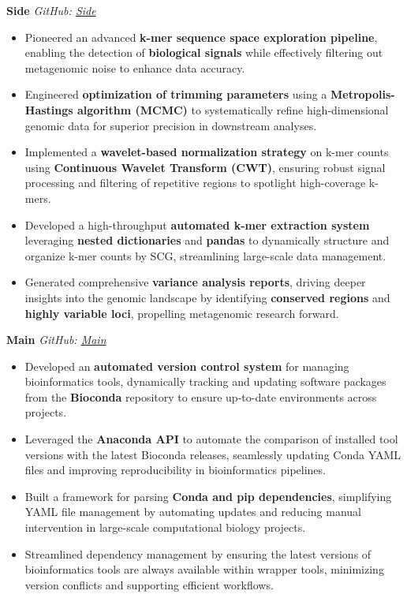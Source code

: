 \documentclass[a4paper,10pt]{article}
\begin{document}
	\textbf{Side} \hfill \textit{GitHub: \href{https://github.com/GABallena/Side}{Side}}
	\begin{itemize}[left=0pt]
		\item Pioneered an advanced \textbf{k-mer sequence space exploration pipeline}, enabling the detection of \textbf{biological signals} while effectively filtering out metagenomic noise to enhance data accuracy.
		\item Engineered \textbf{optimization of trimming parameters} using a \textbf{Metropolis-Hastings algorithm (MCMC)} to systematically refine high-dimensional genomic data for superior precision in downstream analyses.
		\item Implemented a \textbf{wavelet-based normalization strategy} on k-mer counts using \textbf{Continuous Wavelet Transform (CWT)}, ensuring robust signal processing and filtering of repetitive regions to spotlight high-coverage k-mers.
		\item Developed a high-throughput \textbf{automated k-mer extraction system} leveraging \textbf{nested dictionaries} and \textbf{pandas} to dynamically structure and organize k-mer counts by SCG, streamlining large-scale data management.
		\item Generated comprehensive \textbf{variance analysis reports}, driving deeper insights into the genomic landscape by identifying \textbf{conserved regions} and \textbf{highly variable loci}, propelling metagenomic research forward.
	\end{itemize}
	
	
	
		\textbf{Main} \hfill \textit{GitHub: \href{https://github.com/GABallena/Main}{Main}}
	\begin{itemize}[left=0pt]
		\item Developed an \textbf{automated version control system} for managing bioinformatics tools, dynamically tracking and updating software packages from the \textbf{Bioconda} repository to ensure up-to-date environments across projects.
		\item Leveraged the \textbf{Anaconda API} to automate the comparison of installed tool versions with the latest Bioconda releases, seamlessly updating Conda YAML files and improving reproducibility in bioinformatics pipelines.
		\item Built a framework for parsing \textbf{Conda and pip dependencies}, simplifying YAML file management by automating updates and reducing manual intervention in large-scale computational biology projects.
		\item Streamlined dependency management by ensuring the latest versions of bioinformatics tools are always available within wrapper tools, minimizing version conflicts and supporting efficient workflows.
	\end{itemize}
	
\end{document}

